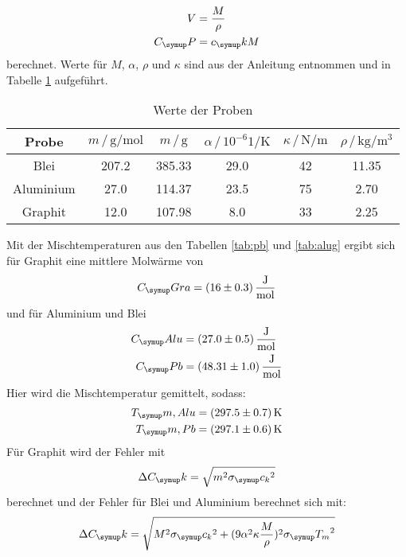 \begin{align*}
  V&=\frac{M}{\rho}\\
  C_\su{P} &= c_\su{k}M
\end{align*}
berechnet. Werte für $M$, $\alpha$, $\rho$ und $\kappa$ sind aus der Anleitung
\cite{201} entnommen und in Tabelle \ref{tab:mol} aufgeführt.
\begin{table}
  \centering
  \begin{tabular}{c | c c c c c}
    \toprule
    Probe & $m\,/\,\si{\gram\per\mol}$&$m\,/\,\si{\gram}$ &$\alpha\,/\,10^{-6}\si{1\per\kelvin}$
    &$\kappa\,/\,\si{\newton\per\meter}$&$\rho\,/\,\si{\kilo\gram\per\cubic
    \meter}$ \\
    \midrule
    Blei      & 207.2 & 385.33 & 29.0 & 42 & 11.35 \\
    Aluminium &  27.0 & 114.37 & 23.5 & 75 &  2.70 \\
    Graphit   &  12.0 & 107.98 &  8.0 & 33 &  2.25 \\
    \bottomrule
  \end{tabular}
  \caption{Werte der Proben}
  \label{tab:mol}
\end{table}
Mit der Mischtemperaturen aus den Tabellen \ref{tab:pb} und \ref{tab:alug}
ergibt sich für Graphit eine mittlere Molwärme von
\begin{equation*}
  C_\su{Gra}= (16\pm0.3)\,\si{\joule\per\mol}
\end{equation*}
und für Aluminium und Blei
\begin{align*}
  C_\su{Alu} &= (27.0\pm0.5)\,\si{\joule\per\mol} \\
  C_\su{Pb} &= (48.31\pm1.0)\,\si{\joule\per\mol}
\end{align*}
Hier wird die Mischtemperatur gemittelt, sodass:
\begin{align*}
  T_\su{m, Alu} &= (297.5\pm0.7)\Kel \\
  T_\su{m, Pb}  &= (297.1\pm0.6)\Kel
\end{align*}
Für Graphit wird der Fehler mit
\begin{equation*}
  \Delta C_\su{k}=\sqrt{m^2\sigma_\su{c_k}^2}
\end{equation*}
berechnet und der Fehler für Blei und Aluminium berechnet sich mit:
\begin{equation*}
  \Delta C_\su{k}=\sqrt{M^2\sigma_\su{c_k}^2+(9\alpha^2\kappa\frac{M}{\rho})^2
  \sigma_\su{T_m}^2}
\end{equation*}
